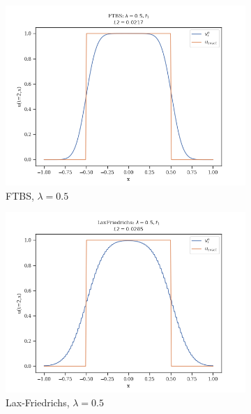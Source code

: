 \begin{figure}
    \centering
    \begin{subfigure}{0.3\linewidth}
        \centering
        \includegraphics[width=\linewidth]{figures/FTBS/FTBS_lambda=0.5,f1}
        \caption{FTBS, $\lambda = 0.5$}
    \end{subfigure}
    \hfill
    \begin{subfigure}{0.3\linewidth}
        \centering
        \includegraphics[width=\linewidth]{figures/LaxFriedrichs/LaxFriedrichs_lambda=0.5,f1}
        \caption{Lax-Friedrichs, $\lambda =0.5$}
    \end{subfigure}
    \hfill
    \begin{subfigure}{0.3\linewidth}

\end{subfigure}
\end{figure}
